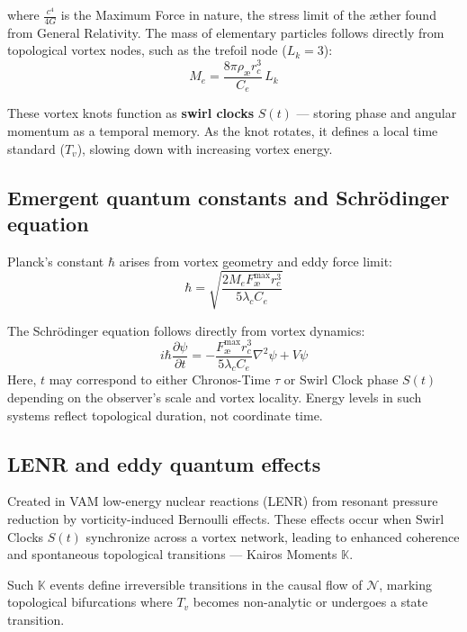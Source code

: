 where $\frac{c^4}{4G}$ is the Maximum Force in nature, the stress limit of the æther found from General Relativity.
The mass of elementary particles follows directly from topological vortex nodes, such as the trefoil node ($L_k=3$):
\begin{equation}
    M_e = \frac{8\pi \rho_\text{\ae} r_c^3}{C_e}\, L_k
\end{equation}

These vortex knots function as \textbf{swirl clocks} $S(t)$ — storing phase and angular momentum as a temporal memory. As the knot rotates, it defines a local time standard ($T_v$), slowing down with increasing vortex energy.


\subsection*{Emergent quantum constants and Schrödinger equation}

Planck's constant $\hbar$ arises from vortex geometry and eddy force limit:
\begin{equation}
    \hbar = \sqrt{\frac{2 M_e F^{\text{max}}_{\text{\ae}} r_c^3}{5 \lambda_c C_e}}
\end{equation}

The Schrödinger equation follows directly from vortex dynamics:
\begin{equation}
    i \hbar \frac{\partial \psi}{\partial t} = -\frac{F^{\text{max}}_{\text{\ae}} r_c^3}{5 \lambda_c C_e}\nabla^2 \psi + V\psi
\end{equation}
Here, $t$ may correspond to either Chronos-Time $\tau$ or Swirl Clock phase $S(t)$ depending on the observer's scale and vortex locality. Energy levels in such systems reflect topological duration, not coordinate time.


\subsection*{LENR and eddy quantum effects}

Created in VAM low-energy nuclear reactions (LENR) from resonant pressure reduction by vorticity-induced Bernoulli effects. These effects occur when Swirl Clocks $S(t)$ synchronize across a vortex network, leading to enhanced coherence and spontaneous topological transitions — Kairos Moments $\mathbb{K}$.

Such $\mathbb{K}$ events define irreversible transitions in the causal flow of $\mathcal{N}$, marking topological bifurcations where $T_v$ becomes non-analytic or undergoes a state transition.

